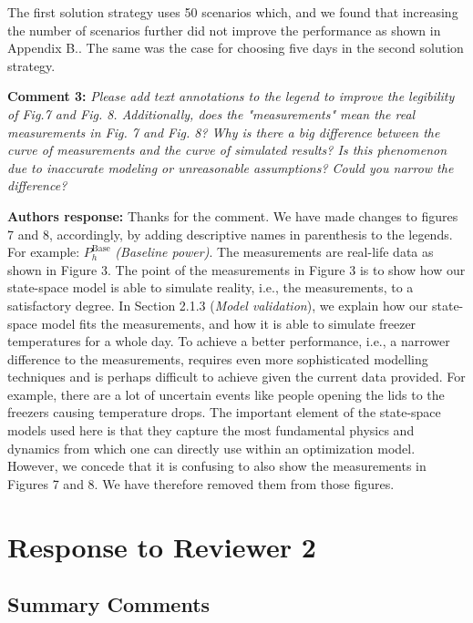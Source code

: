 \documentclass[10pt]{article}
\newcounter{models}
\newcommand{\nt}[1]{\textcolor{newtextcolor}{#1}}
\newcommand{\auth}{\textbf{Authors response: }}
\newcommand{\changes}{\textbf{Changes to the manuscript: }}
\begin{document}
\nt{The first solution strategy uses 50 scenarios which, and we found that increasing the number of scenarios further did not improve the performance as shown in Appendix B.. The same was the case for choosing five days in the second solution strategy.}

\textbf{Comment 3:} \textit{Please add text annotations to the legend to improve the legibility of Fig.7 and Fig. 8. Additionally, does the "measurements" mean the real measurements in Fig. 7 and Fig. 8? Why is there a big difference between the curve of measurements and the curve of simulated results? Is this phenomenon due to inaccurate modeling or unreasonable assumptions? Could you narrow the difference?}

\auth Thanks for the comment. We have made changes to figures 7 and 8, accordingly, by adding descriptive names in parenthesis to the legends. For example: $P_{h}^{\text{Base}}$ \textit{(Baseline power)}. The measurements are real-life data as shown in Figure 3. The point of the measurements in Figure 3 is to show how our state-space model is able to simulate reality, i.e., the measurements, to a satisfactory degree. In Section 2.1.3 (\textit{Model validation}), we explain how our state-space model fits the measurements, and how it is able to simulate freezer temperatures for a whole day. To achieve a better performance, i.e., a narrower difference to the measurements, requires even more sophisticated modelling techniques and is perhaps difficult to achieve given the current data provided. For example, there are a lot of uncertain events like people opening the lids to the freezers causing temperature drops. The important element of the state-space models used here is that they capture the most fundamental physics and dynamics from which one can directly use within an optimization model. However, we concede that it is confusing to also show the measurements in Figures 7 and 8. We have therefore removed them from those figures.




\newpage
\section{Response to Reviewer 2}

\subsection{Summary Comments} \label{rl_sec:rev2_summary_comms}
\end{document}
